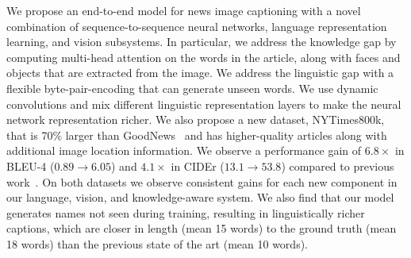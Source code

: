 We propose an end-to-end model for news image captioning with a novel
combination of sequence-to-sequence neural networks, language representation
learning, and vision subsystems. In particular, we address the knowledge gap by
computing multi-head attention on the words in the article, along with faces
and objects that are extracted from the image. We address the linguistic gap
with a flexible byte-pair-encoding that can generate unseen words. We use
dynamic convolutions and mix different linguistic representation layers to make
the neural network representation richer. We also propose a new dataset,
NYTimes800k, that is 70\% larger than GoodNews~\cite{Biten2019GoodNews} and has
higher-quality articles along with additional image location information. We
observe a performance gain of $6.8\times$ in BLEU-4 ($0.89 \rightarrow 6.05$)
and $4.1\times$ in CIDEr ($13.1 \rightarrow 53.8$) compared to previous
work~\cite{Biten2019GoodNews}. On both datasets we observe consistent gains for
each new component in our language, vision, and knowledge-aware system. We also
find that our model generates names not seen during training, resulting in
linguistically richer captions, which are closer in length (mean 15 words) to
the ground truth (mean 18 words) than the previous state of the art (mean 10
words).





